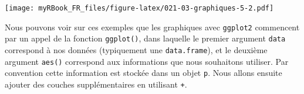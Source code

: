 \documentclass[
]{book}
\newenvironment{Shaded}{\begin{snugshade}}{\end{snugshade}}
\newcommand{\CommentTok}[1]{\textcolor[rgb]{0.56,0.35,0.01}{\textit{#1}}}
\newcommand{\DataTypeTok}[1]{\textcolor[rgb]{0.13,0.29,0.53}{#1}}
\newcommand{\DecValTok}[1]{\textcolor[rgb]{0.00,0.00,0.81}{#1}}
\newcommand{\FloatTok}[1]{\textcolor[rgb]{0.00,0.00,0.81}{#1}}
\newcommand{\KeywordTok}[1]{\textcolor[rgb]{0.13,0.29,0.53}{\textbf{#1}}}
\newcommand{\NormalTok}[1]{#1}
\newcommand{\OperatorTok}[1]{\textcolor[rgb]{0.81,0.36,0.00}{\textbf{#1}}}
\newcommand{\StringTok}[1]{\textcolor[rgb]{0.31,0.60,0.02}{#1}}
\begin{document}
\begin{Shaded}
\end{Shaded}

\texttt{[image: myRBook\_FR\_files/figure-latex/021-03-graphiques-5-2.pdf]}

Nous pouvons voir sur ces exemples que les graphiques avec \texttt{ggplot2} commencent par un appel de la fonction \texttt{ggplot()}, dans laquelle le premier argument \texttt{data} correspond à nos données (typiquement une \texttt{data.frame}), et le deuxième argument \texttt{aes()} correspond aux informations que nous souhaitons utiliser. Par convention cette information est stockée dans un objet \texttt{p}. Nous allons ensuite ajouter des couches supplémentaires en utilisant \texttt{+}.
\end{document}
